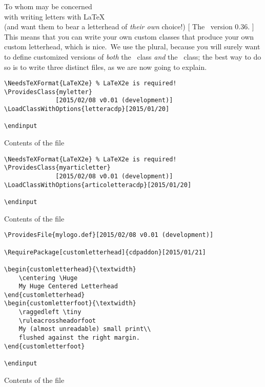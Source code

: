 \begin{letterhead}{
	To whom may be concerned\\
	with writing letters with \LaTeX\\
	(and want them to bear a letterhead
	of \emph{their own} choice!)
}[
	The \Bundle\ version 0.36.
]
This means that you can write your own custom classes that produce your own
custom letterhead, which is nice.~\facesmile\space We use the plural, because
you will surely want to define customized versions of \emph{both} the \lcdp\
class \emph{and} the \acdp\ class; the best way to do so is to write three
distinct files, as we are now going to explain.

\begin{listing}[p]
	\cleantop
\begin{verbatim}
\NeedsTeXFormat{LaTeX2e} % LaTeX2e is required!
\ProvidesClass{myletter}
              [2015/02/08 v0.01 (development)]
\LoadClassWithOptions{letteracdp}[2015/01/20]

\endinput
\end{verbatim}
	\caption{Contents of the\/  file}
	\label{lis:myletter}
\end{listing}

\begin{listing}[p]
\begin{verbatim}
\NeedsTeXFormat{LaTeX2e} % LaTeX2e is required!
\ProvidesClass{myarticletter}
              [2015/02/08 v0.01 (development)]
\LoadClassWithOptions{articoletteracdp}[2015/01/20]

\endinput
\end{verbatim}
	\caption{Contents of the\/  file}
	\label{lis:myarticletter}
\end{listing}

\begin{listing}[p]
	\cleantop
\begin{verbatim}
\ProvidesFile{mylogo.def}[2015/02/08 v0.01 (development)]

\RequirePackage[customletterhead]{cdpaddon}[2015/01/21]

\begin{customletterhead}{\textwidth}
    \centering \Huge
    My Huge Centered Letterhead
\end{customletterhead}
\begin{customletterfoot}{\textwidth}
    \raggedleft \tiny
    \ruleacrossheadorfoot
    My (almost unreadable) small print\\
    flushed against the right margin.
\end{customletterfoot}

\endinput
\end{verbatim}
	\caption{Contents of the\/  file}
	\label{lis:mylogo}
	\cleanbotp
\end{listing}


\end{letterhead}
